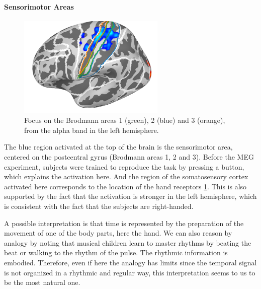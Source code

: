 
\paragraph{Sensorimotor Areas}

\begin{figure}[ht]
    \centering
    \includegraphics[width=7cm]{images_report/source/brodmann_alpha.png}
    \caption[Focus on the Brodmann areas]%
    {Focus on the Brodmann areas 1 (green), 2 (blue) and 3 (orange), from the alpha band in the left hemisphere.}
    \label{brodmann_alpha}
\end{figure}

The blue region activated at the top of the brain is the sensorimotor area, centered on the postcentral gyrus (Brodmann areas 1, 2 and 3). Before the MEG experiment, subjects were trained to reproduce the task by pressing a button, which explains the activation here. And the region of the somatosensory cortex activated here corresponds to the location of the hand receptors \ref{brodmann_alpha}. This is also supported by the fact that the activation is stronger in the left hemisphere, which is consistent with the fact that the subjects are right-handed.

A possible interpretation is that time is represented by the preparation of the movement of one of the body parts, here the hand. We can also reason by analogy by noting that musical children learn to master rhythms by beating the beat or walking to the rhythm of the pulse. The rhythmic information is embodied. Therefore, even if here the analogy has limits since the temporal signal is not organized in a rhythmic and regular way, this interpretation seems to us to be the most natural one.


